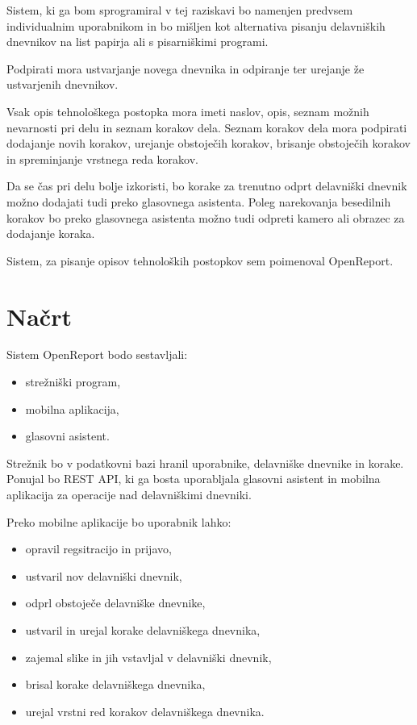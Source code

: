 \documentclass[a4paper, 12pt]{book}
\begin{document}
Sistem, ki ga bom sprogramiral v tej raziskavi bo namenjen predvsem individualnim uporabnikom in bo mišljen kot alternativa pisanju delavniških dnevnikov na list papirja ali s pisarniškimi programi.

Podpirati mora ustvarjanje novega dnevnika in odpiranje ter urejanje že ustvarjenih dnevnikov.

Vsak opis tehnološkega postopka mora imeti naslov, opis, seznam možnih nevarnosti pri delu in seznam korakov dela.
Seznam korakov dela mora podpirati dodajanje novih korakov, urejanje obstoječih korakov, brisanje obstoječih korakov in spreminjanje vrstnega reda korakov.

Da se čas pri delu bolje izkoristi, bo korake za trenutno odprt delavniški dnevnik možno dodajati tudi preko glasovnega asistenta.
Poleg narekovanja besedilnih korakov bo preko glasovnega asistenta možno tudi odpreti kamero ali obrazec za dodajanje koraka.

Sistem, za pisanje opisov tehnoloških postopkov sem poimenoval OpenReport.

\section{Načrt}

Sistem OpenReport bodo sestavljali:
\begin{itemize}
	\item strežniški program, 
	\item mobilna aplikacija,
	\item glasovni asistent.
\end{itemize}

Strežnik bo v podatkovni bazi hranil uporabnike, delavniške dnevnike in korake.
Ponujal bo REST API, ki ga bosta uporabljala glasovni asistent in mobilna aplikacija za operacije nad delavniškimi dnevniki.

Preko mobilne aplikacije bo uporabnik lahko:
\begin{itemize}
	\item opravil regsitracijo in prijavo,
	\item ustvaril nov delavniški dnevnik,
	\item odprl obstoječe delavniške dnevnike,
	\item ustvaril in urejal korake delavniškega dnevnika,
	\item zajemal slike in jih vstavljal v delavniški dnevnik,
	\item brisal korake delavniškega dnevnika,
	\item urejal vrstni red korakov delavniškega dnevnika.
\end{itemize}
\end{document}
